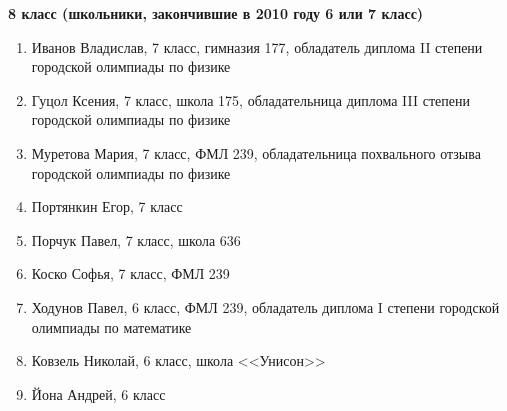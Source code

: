 \textbf{8 класс (школьники, закончившие в 2010 году 6 или 7 класс)}
\begin{enumerate}

\item Иванов Владислав, 7 класс, гимназия 177, обладатель диплома II степени городской олимпиады по физике
\item Гуцол Ксения, 7 класс, школа 175, обладательница диплома III степени городской олимпиады по физике
\item Муретова Мария, 7 класс, ФМЛ 239, обладательница похвального отзыва городской олимпиады по физике
\item Портянкин	Егор, 7 класс
\item Порчук Павел, 7 класс, школа 636
\item Коско	Софья, 7 класс, ФМЛ 239
\item Ходунов Павел, 6 класс, ФМЛ 239, обладатель диплома I степени городской олимпиады по математике
\item Ковзель Николай, 6 класс,	школа <<Унисон>>
\item Йона Андрей, 6 класс
\end{enumerate}

